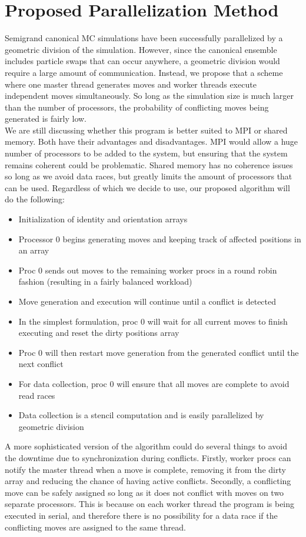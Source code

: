 \documentclass{article}
\begin{document}
\section*{Proposed Parallelization Method}
\vspace{-7pt}
\indent\indent Semigrand canonical MC simulations have been successfully parallelized by a geometric division of the simulation. However, since the canonical ensemble includes particle swaps that can occur anywhere, a geometric division would require a large amount of communication. Instead, we propose that a scheme where one master thread generates moves and worker threads execute independent moves simultaneously. So long as the simulation size is much larger than the number of processors, the probability of conflicting moves being generated is fairly low.\\
\indent We are still discussing whether this program is better suited to MPI or shared memory. Both have their advantages and disadvantages. MPI would allow a huge number of processors to be added to the system, but ensuring that the system remains coherent could be problematic. Shared memory has no coherence issues so long as we avoid data races, but greatly limits the amount of processors that can be used. Regardless of which we decide to use, our proposed algorithm will do the following:
\begin{itemize}
\item Initialization of identity and orientation arrays
\item Processor 0 begins generating moves and keeping track of affected positions in an array
\item Proc 0 sends out moves to the remaining worker procs in a round robin fashion (resulting in a fairly balanced workload)
\item Move generation and execution will continue until a conflict is detected
\item In the simplest formulation, proc 0 will wait for all current moves to finish executing and reset the dirty positions array
\item Proc 0 will then restart move generation from the generated conflict until the next conflict
\item For data collection, proc 0 will ensure that all moves are complete to avoid read races
\item Data collection is a stencil computation and is easily parallelized by geometric division
\end{itemize}
\indent\indent A more sophisticated version of the algorithm could do several things to avoid the downtime due to synchronization during conflicts. Firstly, worker procs can notify the master thread when a move is complete, removing it from the dirty array and reducing the chance of having active conflicts. Secondly, a conflicting move can be safely assigned so long as it does not conflict with moves on two separate processors. This is because on each worker thread the program is being executed in serial, and therefore there is no possibility for a data race if the conflicting moves are assigned to the same thread.
\end{document}
